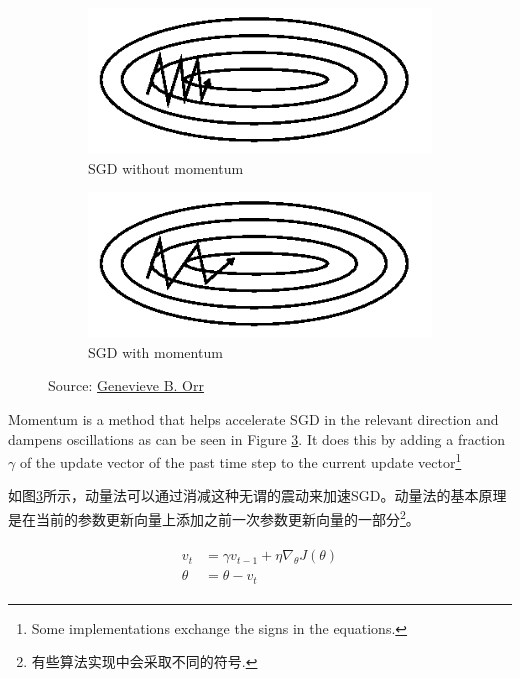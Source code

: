 \documentclass{article}
\begin{document}
\begin{figure}[!htb]
    \centering
    \begin{subfigure}{.5\textwidth}
        \centering
        \includegraphics[width=0.8\linewidth]{images/without_momentum.png}
        \caption{SGD without momentum}
        \label{fig:sgd_without_momentum}
    \end{subfigure}%
    \begin{subfigure}{0.5\textwidth}
        \centering
        \includegraphics[width=0.8\linewidth]{images/with_momentum.png}
        \caption{SGD with momentum}
        \label{fig:sgd_with_momentum}
    \end{subfigure}
    \caption{Source: \href{https://www.willamette.edu/~gorr/classes/cs449/momrate.html}{Genevieve B. Orr}}
\end{figure}

Momentum \cite{Qian1999} is a method that helps accelerate SGD in the relevant direction and dampens oscillations as can be seen in Figure \ref{fig:sgd_with_momentum}. It does this by adding a fraction $\gamma$ of the update vector of the past time step to the current update vector\footnote{Some implementations exchange the signs in the equations.}

如图\ref{fig:sgd_with_momentum}所示，动量法\cite{Qian1999}可以通过消减这种无谓的震动来加速SGD。动量法的基本原理是在当前的参数更新向量上添加之前一次参数更新向量的一部分\footnote{有些算法实现中会采取不同的符号.}。

\begin{align}
\begin{split}
v_t &= \gamma v_{t-1} + \eta \nabla_\theta J( \theta)\\
\theta &= \theta - v_t
\end{split}
\end{align}
\end{document}
